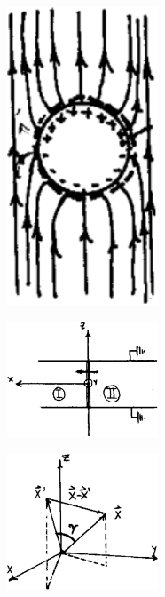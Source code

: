 \documentclass[10pt,oneside]{CBFT_book}
\begin{document}
\begin{figure}[htb]
	\begin{center}
	\includegraphics[width=0.4\textwidth]{images/fig_ft1_perturbacion3.pdf}	 
	\end{center}
	\caption{}
\end{figure} 

\begin{figure}[htb]
	\begin{center}
	\includegraphics[width=0.4\textwidth]{images/fig_ft1_potencial.pdf}	 
	\end{center}
	\caption{}
\end{figure} 


\begin{figure}[htb]
	\begin{center}
	\includegraphics[width=0.4\textwidth]{images/fig_ft1_expansiones1.pdf}	 
	\end{center}
	\caption{}
\end{figure} 
\end{document}

